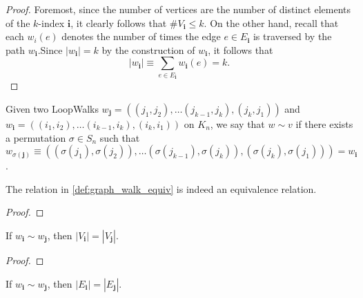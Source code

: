 \begin{proof}
  Foremost, since the number of vertices
  are the number of distinct elements of the $k$-index $\mathbf{i}$, it clearly follows that $\#V_\mathbf{i} \leq k$.
  On the other hand, recall that each $w_i(e)$ denotes the number of times the edge $e \in E_\mathbf{i}$
  is traversed by the path $w_\mathbf{i}$.Since $|w_\mathbf{i}| = k$ by the construction of $w_\mathbf{i}$, it follows that
  \[
  |w_\mathbf{i}| \equiv \sum_{e \in E_\mathbf{i}} w_\mathbf{i}(e) = k.
  \]
\end{proof}


\begin{definition}
  \label{def:graph_walk_equiv}
  Given two LoopWalks $w_{\mathbf{j}} = ((j_1, j_2), \dots (j_{k-1}, j_k), (j_k, j_1))$ and
  $w_{\mathbf{i}}=((i_1, i_2), \dots (i_{k-1}, i_k), (i_k, i_1))$
  on $K_n$, we say that $w \sim v$ if there exists a permutation $\sigma \in S_n$ such that
  $w_{\sigma(\mathbf{j})} \equiv ((\sigma(j_1), \sigma(j_2)),
  \dots (\sigma(j_{k-1}), \sigma(j_k)), (\sigma(j_{k}), \sigma(j_1))) = w_{\mathbf{i}}$.
\end{definition}


\begin{lemma}
  \label{lem:graph_walk_equiv}
  The relation in \ref{def:graph_walk_equiv} is indeed an equivalence relation.
\end{lemma}

\begin{proof}

\end{proof}


\begin{lemma}
  \label{lem:walk_vertex_card_equiv}
  \leanok
  If $w_{\mathbf{i}} \sim w_{\mathbf{j}}$, then $|V_{\mathbf{i}}| = |V_{\mathbf{j}}|$.
\end{lemma}

\begin{proof}

\end{proof}


\begin{lemma}
  \label{lem:walk_edge_card_equiv}
  \leanok
  If $w_{\mathbf{i}} \sim w_{\mathbf{j}}$, then $|E_{\mathbf{i}}| = |E_{\mathbf{j}}|$.
\end{lemma}

